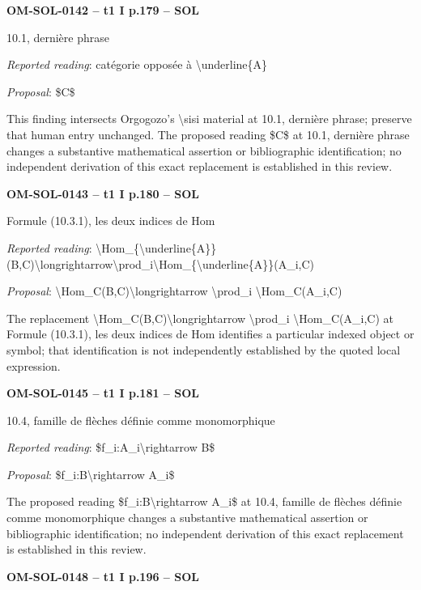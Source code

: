 \par\noindent\textbf{OM-SOL-0142 -- t1 I p.179 -- SOL}\par
10.1, dernière phrase\par
\emph{Reported reading}: catégorie opposée à \textbackslash{}underline\{A\}\par
\emph{Proposal}: \$C\$\par
This finding intersects Orgogozo's \textbackslash{}sisi material at 10.1, dernière phrase; preserve that human entry unchanged. The proposed reading \$C\$ at 10.1, dernière phrase changes a substantive mathematical assertion or bibliographic identification; no independent derivation of this exact replacement is established in this review.\par
\par\noindent\textbf{OM-SOL-0143 -- t1 I p.180 -- SOL}\par
Formule (10.3.1), les deux indices de Hom\par
\emph{Reported reading}: \textbackslash{}Hom\_\{\textbackslash{}underline\{A\}\}(B,C)\textbackslash{}longrightarrow\textbackslash{}prod\_i\textbackslash{}Hom\_\{\textbackslash{}underline\{A\}\}(A\_i,C)\par
\emph{Proposal}: \textbackslash{}Hom\_C(B,C)\textbackslash{}longrightarrow \textbackslash{}prod\_i \textbackslash{}Hom\_C(A\_i,C)\par
The replacement \textbackslash{}Hom\_C(B,C)\textbackslash{}longrightarrow \textbackslash{}prod\_i \textbackslash{}Hom\_C(A\_i,C) at Formule (10.3.1), les deux indices de Hom identifies a particular indexed object or symbol; that identification is not independently established by the quoted local expression.\par
\par\noindent\textbf{OM-SOL-0145 -- t1 I p.181 -- SOL}\par
10.4, famille de flèches définie comme monomorphique\par
\emph{Reported reading}: \$f\_i:A\_i\textbackslash{}rightarrow B\$\par
\emph{Proposal}: \$f\_i:B\textbackslash{}rightarrow A\_i\$\par
The proposed reading \$f\_i:B\textbackslash{}rightarrow A\_i\$ at 10.4, famille de flèches définie comme monomorphique changes a substantive mathematical assertion or bibliographic identification; no independent derivation of this exact replacement is established in this review.\par
\par\noindent\textbf{OM-SOL-0148 -- t1 I p.196 -- SOL}\par
